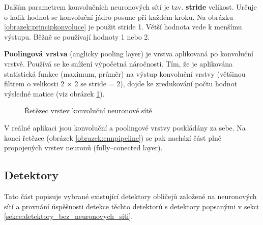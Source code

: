 Dalším parametrem konvolučních neuronových sítí je tzv. \textbf{stride} velikost. Určuje o kolik hodnot se konvoluční jádro posune při každém kroku. Na obrázku \ref{obrazek:principkonvoluce} je použit stride 1. Větší hodnota vede k menšímu výstupu. Běžně se používají hodnoty 1 nebo 2.

\textbf{Poolingová vrstva} (anglicky pooling layer) je vrstva aplikovaná po konvoluční vrstvě. Používá se ke snížení výpočetná náročnosti. Tím, že je aplikována statistická funkce (maximum, průměr) na výstup konvoluční vrstvy (většinou filtrem o velikosti 2 $\times$ 2 se stride = 2), dojde ke zredukování počtu hodnot výsledné matice (viz obrázek \ref{obrazek:cnnpooling}).

\begin{figure}[H]
  \begin{center}
  \label{obrazek:cnnpooling}
  \caption{Řetězec vrstev konvoluční neuronové sítě \cite{cnnCv}}
  \end{center}
\end{figure}

V reálné aplikaci jsou konvoluční a poolingové vrstvy poskládány za sebe. Na konci řetězce (obrázek \ref{obrazek:cnnpipeline}) se pak nachází část plně propojených vrstev neuronů (fully--conected layer).

\subsection*{Detektory}
Tato část popisuje vybrané existující detektory obličejů založené na neuronových sítí a provnání úspěšnosti detekce těchto detektorů s detektory popsanými v sekci \ref{sekce:detektory_bez_neuronovych_siti}.

